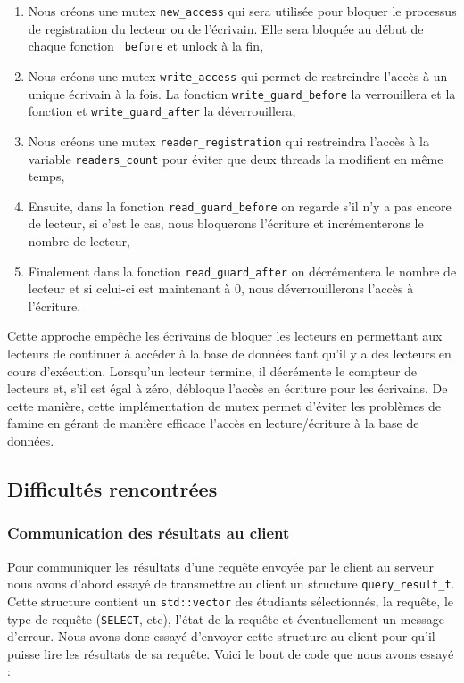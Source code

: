 \documentclass[utf8]{article}
\begin{document}
\begin{enumerate}
	\item Nous créons une mutex \texttt{new\_access} qui sera utilisée pour bloquer le processus de registration du lecteur ou de l'écrivain. Elle sera bloquée au début de chaque fonction \texttt{\_before} et unlock à la fin,
	\item Nous créons une mutex \texttt{write\_access} qui permet de restreindre l'accès à un unique écrivain à la fois. La fonction \texttt{write\_guard\_before} la verrouillera et la fonction et \texttt{write\_guard\_after} la déverrouillera,
	\item Nous créons une mutex \texttt{reader\_registration} qui restreindra l'accès à la variable \texttt{readers\_count} pour éviter que deux threads la modifient en même temps,
	\item Ensuite, dans la fonction \texttt{read\_guard\_before} on regarde s'il n'y a pas encore de lecteur, si c'est le cas, nous bloquerons l'écriture et incrémenterons le nombre de lecteur,
	\item Finalement dans la fonction \texttt{read\_guard\_after} on décrémentera le nombre de lecteur et si celui-ci est maintenant à 0, nous déverrouillerons l'accès à l'écriture.
\end{enumerate}

Cette approche empêche les écrivains de bloquer les lecteurs en permettant aux lecteurs de continuer à accéder à la base de données tant qu'il y a des lecteurs en cours d'exécution. Lorsqu'un lecteur termine, il décrémente le compteur de lecteurs et, s'il est égal à zéro, débloque l'accès en écriture pour les écrivains. De cette manière, cette implémentation de mutex permet d'éviter les problèmes de famine en gérant de manière efficace l'accès en lecture/écriture à la base de données.

\subsection{Difficultés rencontrées}

\subsubsection{Communication des résultats au client}


Pour communiquer les résultats d'une requête envoyée par le client au serveur nous avons d'abord essayé de transmettre au client un structure \texttt{query\_result\_t}. Cette structure contient un \texttt{std::vector} des étudiants sélectionnés, la requête, le type de requête (\texttt{SELECT}, etc), l'état de la requête et éventuellement un message d'erreur. Nous avons donc essayé d'envoyer cette structure au client pour qu'il puisse lire les résultats de sa requête. Voici le bout de code que nous avons essayé :
\end{document}
